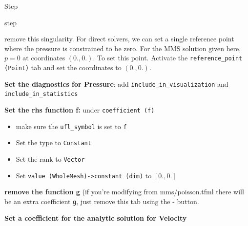 \begin{steps}{Step}
\begin{steps}{step}
\begin{itemize}
        remove this singularity.  For direct solvers, we can set  a single reference
        point where the pressure is constrained to be zero. For
        the MMS solution given here, $p=0$ at coordinates $(0.,0.)$.
        To set this point.  Activate the \texttt{reference\_point
          (Point)} tab and set the coordinates to $(0.,0.)$.
      \end{itemize}
  \item \textbf{Set the diagnostics for Pressure}: add \texttt{include\_in\_visualization} and \texttt{include\_in\_statistics}
  \item \textbf{Set the rhs function f:} under \texttt{coefficient (f)}
    \begin{itemize}
    \item make sure the \texttt{ufl\_symbol} is set to \texttt{f}
    \item Set the type to \texttt{Constant}
    \item Set the rank to \texttt{Vector}
    \item Set \texttt{value (WholeMesh)->constant (dim)} to $[0.,0.]$
    \end{itemize}
  \item \textbf{remove the function g} (if you're modifying from
    mms/poisson.tfml there will be an extra coefficient \texttt{g},
    just remove this tab using the - button.
  \item \textbf{Set a coefficient for the analytic solution for Velocity}

\end{steps}
\end{steps}
